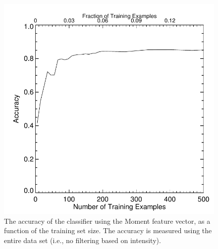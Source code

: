 \begin{figure}
\includegraphics{learning_rate}
\caption{The accuracy of the classifier using the Moment feature vector,  as a function of the training set size. The accuracy is measured using the entire data set (i.e., no filtering based on intensity). }
\label{fig:learning_rate}
\end{figure}

